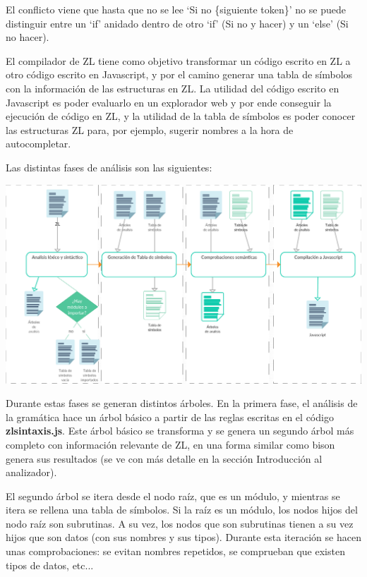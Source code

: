 \documentclass{report}
\begin{document}
	\vspace{10px}
	
	El conflicto\cite{conflictoll3} viene que hasta que no se lee `Si no \{siguiente token\}' no se puede distinguir entre un `if' anidado dentro de otro `if' (Si no y hacer) y un `else' (Si no hacer).
	
	El compilador de ZL tiene como objetivo transformar un código escrito en ZL a otro código escrito en Javascript, y por el camino generar una tabla de símbolos con la información de las estructuras en ZL. La utilidad del código escrito en Javascript es poder evaluarlo en un explorador web y por ende conseguir la ejecución de código en ZL, y la utilidad de la tabla de símbolos es poder conocer las estructuras ZL para, por ejemplo, sugerir nombres a la hora de autocompletar. 
	
	\vspace{10px}
	
	Las distintas fases de análisis son las siguientes:
	
	\begin{center}
	\includegraphics[width=1\linewidth]{fasesanalisis}
	\end{center}
	
		
	Durante estas fases se generan distintos árboles. En la primera fase, el análisis de la gramática hace un árbol básico a partir de las reglas escritas en el código \textbf{zlsintaxis.js}. Este árbol básico se transforma y se genera un segundo árbol más completo con información relevante de ZL, en una forma similar como bison genera sus resultados (se ve con más detalle en la sección Introducción al analizador).
	
	\vspace{10px}
	
	El segundo árbol se itera desde el nodo raíz, que es un módulo, y mientras se itera se rellena una tabla de símbolos. Si la raíz es un módulo, los nodos hijos del nodo raíz son subrutinas. A su vez, los nodos que son subrutinas tienen a su vez hijos que son datos (con sus nombres y sus tipos). Durante esta iteración se hacen unas comprobaciones: se evitan nombres repetidos, se comprueban que existen tipos de datos, etc...
	
\end{document}
